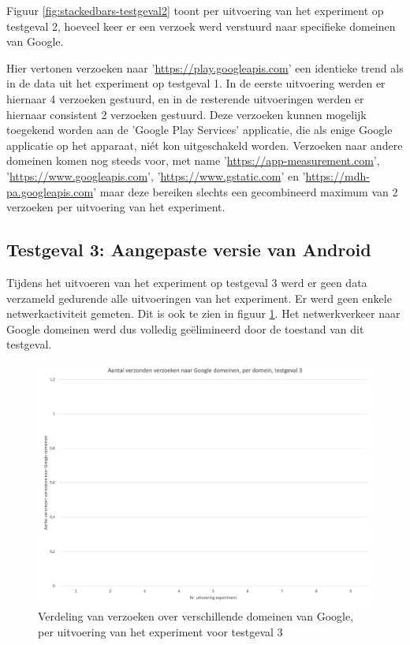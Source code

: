 Figuur \ref{fig:stackedbars-testgeval2} toont per uitvoering van het experiment op testgeval 2, hoeveel keer er een verzoek werd verstuurd naar specifieke domeinen van Google. 

Hier vertonen verzoeken naar '\url{https://play.googleapis.com}' een identieke trend als in de data uit het experiment op testgeval 1. In de eerste uitvoering werden er hiernaar 4 verzoeken gestuurd, en in de resterende uitvoeringen werden er hiernaar consistent 2 verzoeken gestuurd. Deze verzoeken kunnen mogelijk toegekend worden aan de 'Google Play Services' applicatie, die als enige Google applicatie op het apparaat, niét kon uitgeschakeld worden. Verzoeken naar andere domeinen komen nog steeds voor, met name '\url{https://app-measurement.com}', '\url{https://www.googleapis.com}', '\url{https://www.gstatic.com}' en '\url{https://mdh-pa.googleapis.com}' maar deze bereiken slechts een gecombineerd maximum van 2 verzoeken per uitvoering van het experiment.

\subsection{Testgeval 3: Aangepaste versie van Android}
Tijdens het uitvoeren van het experiment op testgeval 3 werd er geen data verzameld gedurende alle uitvoeringen van het experiment. Er werd geen enkele netwerkactiviteit gemeten. Dit is ook te zien in figuur \ref{fig:stackedbars-testgeval3}. Het netwerkverkeer naar Google domeinen werd dus volledig geëlimineerd door de toestand van dit testgeval.

\begin{figure}
    \centering
    \includegraphics[width=1\textwidth]{experiment/grafieken/stackedbars-testgeval3.png}
    \caption{Verdeling van verzoeken over verschillende domeinen van Google, per uitvoering van het experiment voor testgeval 3}
    \label{fig:stackedbars-testgeval3}
\end{figure}

